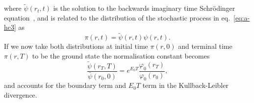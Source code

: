 where $\tilde{\psi}\left(r_{t}, t\right)$ is the solution to the backwards imaginary time Schr\" odinger equation~\cite{barr2020quantum}, and is related to the distribution of the stochastic process in eq.~\eqref{eq:a-hc3} as
\begin{equation}
	\pi(r, t) = \tilde{\psi}\left(r, t\right) \psi\left(r, t\right).
\end{equation}
If we now take both distributions at initial time $\pi(r, 0)$ and terminal time $\pi(r, T)$ to be the ground state the normalisation constant becomes
\begin{equation}
	\frac{\tilde{\psi}\left(r_{T}, T\right)}{\bar{\psi}\left(r_{0}, 0\right)} = e^{E_{0} T} \frac{\varphi_{0}\left(r_{T}\right)}{\varphi_{0}\left(r_{0}\right)},
\end{equation}
and accounts for the boundary term and $E_0 T$ term in the Kullback-Leibler divergence.


